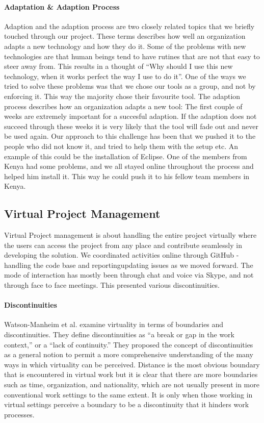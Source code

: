 \paragraph{Adaptation \& Adaption Process} \label{par:adaptationandadaptationprocess}
Adaption and the adaption process \cite{tyre1994windows} are two closely related topics that we briefly touched through our project. These terms describes how well an organization adapts a new technology and how they do it. Some of the problems with new technologies are that human beings tend to have rutines that are not that easy to steer away from. This results in a thought of ``Why should I use this new technology, when it works perfect the way I use to do it''. One of the ways we tried to solve these problems was that we chose our tools as a group, and not by enforcing it. This way the majority chose their favourite tool. The adaption process describes how an organization adapts a new tool: The first couple of weeks are extremely important for a succesful adaption. If the adaption does not succeed through these weeks it is very likely that the tool will fade out and never be used again. Our approach to this challenge has been that we pushed it to the people who did not know it, and tried to help them with the setup etc. An example of this could be the installation of Eclipse. One of the members from Kenya had some problems, and we all stayed online throughout the process and helped him install it. This way he could push it to his fellow team members in Kenya.

\subsection{Virtual Project Management} \label{subsec:adaptationandadaptationprocess}
Virtual Project management is about handling the entire project virtually where the users can access the project from any place and contribute seamlessly in developing the solution. We coordinated activities online through GitHub - handling the code base and reporting\/updating issues as we moved forward. The mode of interaction has mostly been through chat and voice via Skype, and not through face to face meetings. This presented various discontinuities.

\paragraph{Discontinuities} \label{par:discontinuities}
Watson-Manheim et al. \cite{watson2007distance} examine virtuality in terms of boundaries and discontinuities. They define discontinuities as “a break or gap in the work context,” or a “lack of continuity.” They proposed the concept of discontinuities as a general notion to permit a more comprehensive understanding of the many ways in which virtuality can be perceived.
Distance is the most obvious boundary that is encountered in virtual work but it is clear that there are more boundaries such as time, organization, and nationality, which are not usually present in more conventional work settings to the same extent. It is only when those working in virtual settings perceive a boundary to be a discontinuity that it hinders work processes. 

